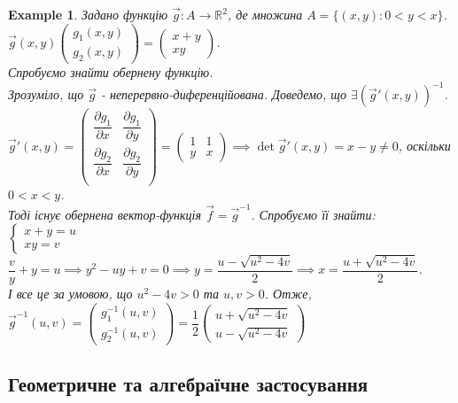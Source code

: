 \documentclass[a4paper, 10pt]{article}
\def\departial#1#2{\dfrac{\partial {#1}}{\partial {#2}}}
\theoremstyle{theoremdd}
\theoremstyle{theoremdd}
\theoremstyle{theoremdd}
\theoremstyle{theoremdd}
\theoremstyle{theoremdd}
\newtheorem{example}[theorem]{Example}
\theoremstyle{theoremdd}
\theoremstyle{theoremdd}
\theoremstyle{theoremdd}
\theoremstyle{theoremdd}
\begin{document}
\begin{example}
Задано функцію $\vec{g}: A \to \mathbb{R}^2$, де множина $A = \{(x,y): 0 < y < x\}$.\\
$\vec{g}(x,y) \begin{pmatrix}
g_1(x,y) \\ g_2(x,y)
\end{pmatrix} = \begin{pmatrix}
x+y \\ xy
\end{pmatrix}$.\\
Спробуємо знайти обернену функцію.\\
Зрозуміло, що $\vec{g}$ - неперервно-диференційована. Доведемо, що $\exists (\vec{g}'(x,y))^{-1}$.\\
$\vec{g}'(x,y) = \begin{pmatrix}
\departial{g_1}{x} & \departial{g_1}{y} \\
\departial{g_2}{x} & \departial{g_2}{y} \\
\end{pmatrix} = \begin{pmatrix}
1 & 1 \\
y & x
\end{pmatrix} \implies \det \vec{g}'(x,y) = x-y \neq 0$, оскільки $0<x<y$.\\
Тоді існує обернена вектор-функція $\vec{f} = \vec{g}^{-1}$. Спробуємо її знайти:\\
$\begin{cases}
x+y = u \\
xy = v
\end{cases}$\\
$\dfrac{v}{y}+y = u \implies y^2 -uy + v = 0 \implies y = \dfrac{u-\sqrt{u^2-4v}}{2} \implies x = \dfrac{u+\sqrt{u^2-4v}}{2}$.\\
І все це за умовою, що $u^2-4v>0$ та $u,v>0$. Отже, $\vec{g}^{-1}(u,v) = \begin{pmatrix}
g_1^{-1}(u,v) \\ g_2^{-1}(u,v)
\end{pmatrix} = \dfrac{1}{2} \begin{pmatrix}
u + \sqrt{u^2-4v} \\ u-\sqrt{u^2-4v}
\end{pmatrix}$
\end{example}

\subsection{Геометричне та алгебраїчне застосування}
\end{document}
